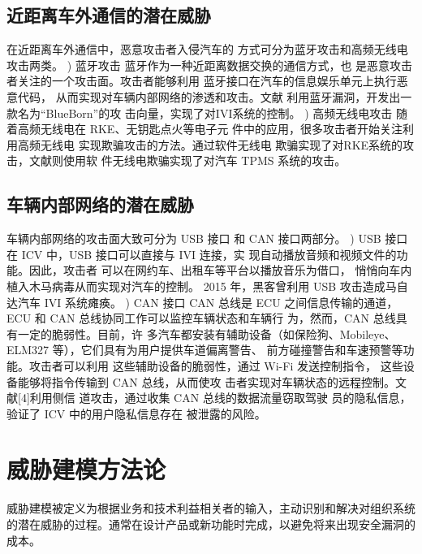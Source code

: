 \subsection{近距离车外通信的潜在威胁}
在近距离车外通信中，恶意攻击者入侵汽车的
方式可分为蓝牙攻击和高频无线电攻击两类。
) 蓝牙攻击
蓝牙作为一种近距离数据交换的通信方式，也
是恶意攻击者关注的一个攻击面。攻击者能够利用
蓝牙接口在汽车的信息娱乐单元上执行恶意代码，
从而实现对车辆内部网络的渗透和攻击。文献\cite{antian}
利用蓝牙漏洞，开发出一款名为“BlueBorn”的攻
击向量，实现了对IVI系统的控制。
) 高频无线电攻击
随着高频无线电在 RKE、无钥匙点火等电子元
件中的应用，很多攻击者开始关注利用高频无线电
实现欺骗攻击的方法。通过软件无线电
欺骗实现了对RKE系统的攻击，文献\cite{wuxiandian}则使用软
件无线电欺骗实现了对汽车 TPMS 系统的攻击。

\subsection{车辆内部网络的潜在威胁}
车辆内部网络的攻击面大致可分为 USB 接口
和 CAN 接口两部分。
) USB 接口
在 ICV 中，USB 接口可以直接与 IVI 连接，实
现自动播放音频和视频文件的功能。因此，攻击者
可以在网约车、出租车等平台以播放音乐为借口，
悄悄向车内植入木马病毒从而实现对汽车的控制。
2015 年，黑客曾利用 USB 攻击造成马自达汽车 IVI
系统瘫痪。
) CAN 接口
CAN 总线是 ECU 之间信息传输的通道，ECU
和 CAN 总线协同工作可以监控车辆状态和车辆行
为，然而，CAN 总线具有一定的脆弱性。目前，许
多汽车都安装有辅助设备（如保险狗、Mobileye、
ELM327 等），它们具有为用户提供车道偏离警告、
前方碰撞警告和车速预警等功能。攻击者可以利用
这些辅助设备的脆弱性，通过 Wi-Fi 发送控制指令，
这些设备能够将指令传输到 CAN 总线，从而使攻
击者实现对车辆状态的远程控制。文献[4]利用侧信
道攻击，通过收集 CAN 总线的数据流量窃取驾驶
员的隐私信息，验证了 ICV 中的用户隐私信息存在
被泄露的风险。


\section{威胁建模方法论}
威胁建模被定义为根据业务和技术利益相关者的输入，主动识别和解决对组织系统的潜在威胁的过程。通常在设计产品或新功能时完成，以避免将来出现安全漏洞的成本。

